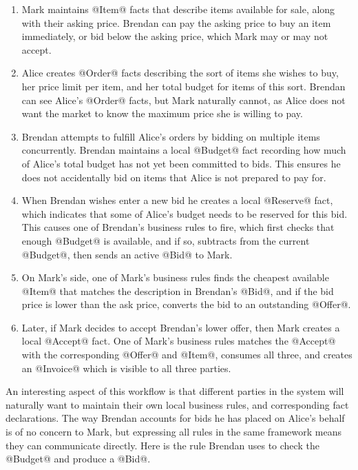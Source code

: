 \begin{enumerate}
\item Mark maintains @Item@ facts that describe items available for sale, along with their asking price. Brendan can pay the asking price to buy an item immediately, or bid below the asking price, which Mark may or may not accept.

\item Alice creates @Order@ facts describing the sort of items she wishes to buy, her price limit per item, and her total budget for items of this sort. Brendan can see Alice's @Order@ facts, but Mark naturally cannot, as Alice does not want the market to know the maximum price she is willing to pay.

\item Brendan attempts to fulfill Alice's orders by bidding on multiple items concurrently. Brendan maintains a local @Budget@ fact recording how much of Alice's total budget has not yet been committed to bids. This ensures he does not accidentally bid on items that Alice is not prepared to pay for.

\item When Brendan wishes enter a new bid he creates a local @Reserve@ fact, which indicates that some of Alice's budget needs to be reserved for this bid. This causes one of Brendan's business rules to fire, which first checks that enough @Budget@ is available, and if so, subtracts from the current @Budget@, then sends an active @Bid@ to Mark.

\item On Mark's side, one of Mark's business rules finds the cheapest available @Item@ that matches the description in Brendan's @Bid@, and if the bid price is lower than the ask price, converts the bid to an outstanding @Offer@.

\item Later, if Mark decides to accept Brendan's lower offer, then Mark creates a local @Accept@ fact. One of Mark's business rules matches the @Accept@ with the corresponding @Offer@ and @Item@, consumes all three, and creates an @Invoice@ which is visible to all three parties.
\end{enumerate}

An interesting aspect of this workflow is that different parties in the system will naturally want to maintain their own local business rules, and corresponding fact declarations. The way Brendan accounts for bids he has placed on Alice's behalf is of no concern to Mark, but expressing all rules in the same framework means they can communicate directly. Here is the rule Brendan uses to check the @Budget@ and produce a @Bid@.

